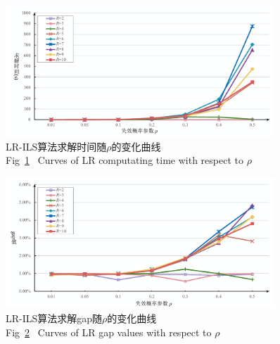 \begin{figure}[ht] %
\setlength{\belowcaptionskip}{-0.5cm} 
  \centering
  \includegraphics[width=0.9\textwidth]{figures/result_time_with_rho.pdf}
  \caption{LR-ILS算法求解时间随$\rho$的变化曲线\\Fig~\ref{fig:result_time_rho}~ Curves of LR computating time with respect to $\rho$}
  \label{fig:result_time_rho}
\end{figure}

\begin{figure}[ht] %
	\setlength{\belowcaptionskip}{-0.5cm} 
	  \centering
	  \includegraphics[width=0.9\textwidth]{figures/result_gap_with_rho.pdf}
	  \caption{LR-ILS算法求解gap随$\rho$的变化曲线\\Fig~\ref{fig:result_gap_rho}~ Curves of LR gap values with respect to $\rho$}
	  \label{fig:result_gap_rho}
\end{figure}


